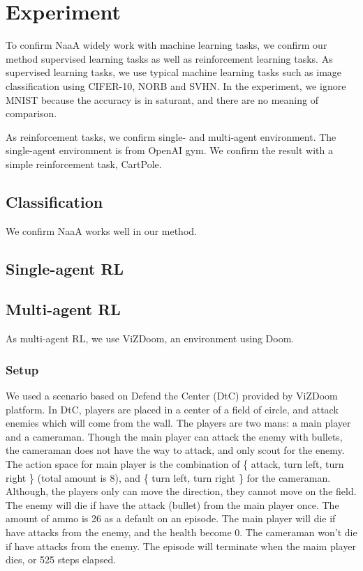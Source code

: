 \section{Experiment}
To confirm NaaA widely work with machine learning tasks,
we confirm our method supervised learning tasks as well as reinforcement learning tasks.
As supervised learning tasks, we use typical machine learning tasks such as image classification
using CIFER-10, NORB and SVHN.
In the experiment, we ignore MNIST because the accuracy is in saturant, and there are no meaning of comparison.

As reinforcement tasks, we confirm single- and multi-agent environment.
The single-agent environment is from OpenAI gym.
We confirm the result with a simple reinforcement task, CartPole.

\subsection{Classification}
We confirm NaaA works well in our method.

\subsection{Single-agent RL}

\subsection{Multi-agent RL}
As multi-agent RL, we use ViZDoom, an environment using Doom.

\subsubsection{Setup}
We used a scenario based on Defend the Center (DtC) provided by ViZDoom platform.
In DtC, players are placed in a center of a field of circle, and attack enemies which will come from the wall.
The players are two mans: a main player and a cameraman.
Though the main player can attack the enemy with bullets, 
the cameraman does not have the way to attack, and only scout for the enemy.
The action space for main player is the combination of \{ attack, turn left, turn right \} (total amount is 8),
and \{ turn left, turn right \} for the cameraman.
Although, the players only can move the direction, they cannot move on the field.
The enemy will die if have the attack (bullet) from the main player once.
The amount of ammo is 26 as a default on an episode.
The main player will die if have attacks from the enemy, and the health become 0.
The cameraman won't die if have attacks from the enemy.
The episode will terminate when the maim player dies, or 525 steps elapsed.

